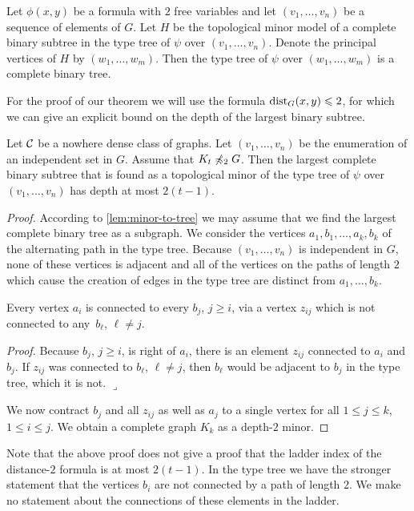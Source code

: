 \begin{lemma}\label{lem:minor-to-tree}
Let $\phi(x,y)$ be a formula with $2$ free variables and let
$(v_1,\ldots, v_n)$ be a sequence of elements of $G$. Let $H$
be the topological minor model of a complete binary subtree in the
type tree of $\psi$ over $(v_1,\ldots, v_n)$. Denote the 
principal vertices of $H$ by $(w_1,\ldots, w_m)$. Then the type
tree of $\psi$ over $(w_1,\ldots, w_m)$ is a complete binary
tree. 
\end{lemma}

For the proof of our theorem we will use the formula 
$\mathrm{dist}_G(x,y)\leqslant 2$, for which we can give an explicit 
bound on the depth of the largest binary subtree.

\begin{theorem}
Let $\mathcal{C}$ be a nowhere dense class of graphs. Let 
$(v_1,\ldots, v_n)$ be the enumeration of an independent set 
in $G$. Assume that $K_t\not\preccurlyeq_2G$. 
Then the largest complete binary subtree that is found as a topological minor 
of the type tree of $\psi$ over
$(v_1,\ldots, v_n)$ has depth at most $2(t-1)$. 
\end{theorem}
\begin{proof}
According to \cref{lem:minor-to-tree} we may assume that we find
the largest complete binary tree as a subgraph. We consider the
vertices $a_1,b_1,\ldots, a_k,b_k$ of the alternating path in the
type tree. Because $(v_1,\ldots, v_n)$ is independent in $G$, 
none of these vertices is adjacent and all of the vertices on the
paths of length $2$ which cause the creation of edges in the type
tree are distinct from $a_1,\ldots, b_k$. 

\begin{claim}
Every vertex $a_i$ is connected to every $b_j$, $j\geq i$,
via a vertex $z_{ij}$ which is not connected to any~$b_\ell$, $\ell\neq j$. 
\end{claim}

\noindent\textit{Proof.} Because $b_j$, $j\geq i$, is right of $a_i$, there is 
an element $z_{ij}$ connected to $a_i$ and $b_j$. If $z_{ij}$ was 
connected to $b_\ell$, $\ell\neq j$, then $b_\ell$ would be adjacent 
to $b_j$ in the type tree, which it is not. \hfill$\lrcorner$

\bigskip
We now contract $b_j$ and all $z_{ij}$ as well as $a_j$ to a single 
vertex for all $1\leq j\leq k$, $1\leq i\leq j$. We obtain a complete
graph $K_k$ as a depth-$2$ minor. 
\end{proof}

Note that the above proof does not give a proof that the ladder
index of the distance-$2$ formula is at most $2(t-1)$. In the type
tree we have the stronger statement that the vertices $b_i$
are not connected by a path of length $2$. 
We make no statement about the connections
of these elements in the ladder. 

